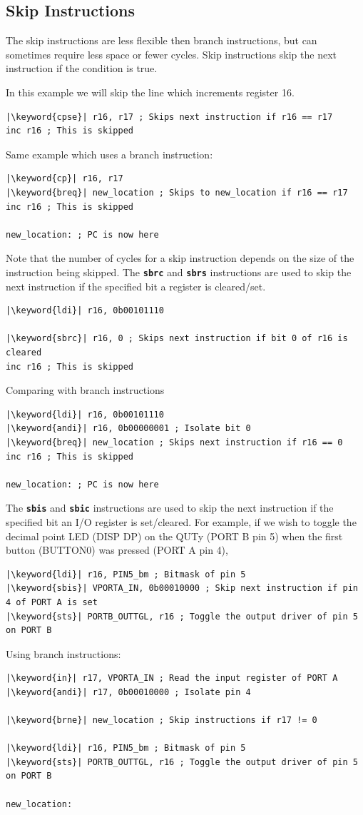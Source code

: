 \documentclass{report}
\newcommand{\keyword}[1]{\textcolor[rgb]{0.00,0.50,0.00}{\textbf{#1}}}
\newcommand{\keywordinline}[1]{\textcolor[rgb]{0.00,0.50,0.00}{\textbf{\texttt{#1}}}}
\begin{document}
\subsection{Skip Instructions}
The skip instructions are less flexible then branch instructions, but can sometimes require less space or fewer cycles.
Skip instructions skip the next instruction if the condition is true.

In this example we will skip the line which increments register 16.
\begin{verbatim}
|\keyword{cpse}| r16, r17 ; Skips next instruction if r16 == r17
inc r16 ; This is skipped
\end{verbatim}
Same example which uses a branch instruction:
\begin{verbatim}
|\keyword{cp}| r16, r17
|\keyword{breq}| new_location ; Skips to new_location if r16 == r17
inc r16 ; This is skipped

new_location: ; PC is now here
\end{verbatim}
Note that the number of cycles for a skip instruction depends on the size of the instruction being skipped.
The \keywordinline{sbrc} and \keywordinline{sbrs} instructions are used to skip the next instruction if the specified bit a register is cleared/set.
\begin{verbatim}
|\keyword{ldi}| r16, 0b00101110

|\keyword{sbrc}| r16, 0 ; Skips next instruction if bit 0 of r16 is cleared
inc r16 ; This is skipped
\end{verbatim}
Comparing with branch instructions
\begin{verbatim}
|\keyword{ldi}| r16, 0b00101110
|\keyword{andi}| r16, 0b00000001 ; Isolate bit 0
|\keyword{breq}| new_location ; Skips next instruction if r16 == 0
inc r16 ; This is skipped

new_location: ; PC is now here
\end{verbatim}
The \keywordinline{sbis} and \keywordinline{sbic} instructions are used to skip the next instruction if the specified bit an I/O register is set/cleared.
For example, if we wish to toggle the decimal point LED (DISP DP) on the QUTy (PORT B pin 5) when the first button (BUTTON0) was pressed (PORT A pin 4),
\begin{verbatim}
|\keyword{ldi}| r16, PIN5_bm ; Bitmask of pin 5
|\keyword{sbis}| VPORTA_IN, 0b00010000 ; Skip next instruction if pin 4 of PORT A is set
|\keyword{sts}| PORTB_OUTTGL, r16 ; Toggle the output driver of pin 5 on PORT B
\end{verbatim}
Using branch instructions:
\begin{verbatim}
|\keyword{in}| r17, VPORTA_IN ; Read the input register of PORT A
|\keyword{andi}| r17, 0b00010000 ; Isolate pin 4

|\keyword{brne}| new_location ; Skip instructions if r17 != 0

|\keyword{ldi}| r16, PIN5_bm ; Bitmask of pin 5
|\keyword{sts}| PORTB_OUTTGL, r16 ; Toggle the output driver of pin 5 on PORT B

new_location:
\end{verbatim}
\end{document}
